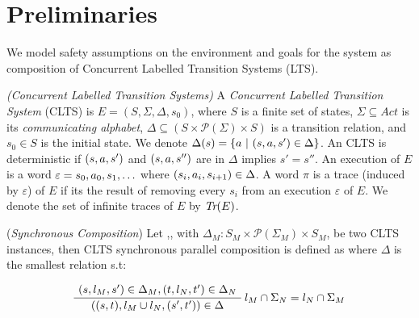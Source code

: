 \section{Preliminaries}

We model safety assumptions on the environment and goals for the system as composition of Concurrent Labelled Transition Systems (LTS). 

\begin{definition}
	\label{def:CLTS} \emph{(Concurrent Labelled Transition Systems)} 
	A \emph{Concurrent Labelled Transition System} (CLTS) is $E =  (S, \Sigma, \Delta, s_0)$, where $S$ is a finite set of states, $\Sigma \subseteq Act$ is its {\em communicating alphabet}, $\Delta \subseteq (S \times \mathcal{P}(\Sigma) \times S)$ is a transition relation, and $s_0 \in S$ is the initial state.  We denote $\Delta(s)=\{a~|~(s,a,s') \in \Delta\}$. 
	An CLTS is deterministic if $(s,a,s')$ and $(s,a,s'')$ are in $\Delta$ implies $s'=s''$.
	An execution of $E$ is a word $\varepsilon=s_0, a_0, s_1, \ldots$ where $(s_i, a_i, s_{i+1}) \in \Delta$. 
	A word $\pi$ is a trace (induced by $\varepsilon$) of $E$ if its the result of removing every $s_i$ from an execution $\varepsilon$ of $E$. 
	We denote the set of infinite traces of $E$ by $\emph{Tr}(E)$. 
\end{definition}


\begin{definition} 
	\label{def:synchronous_composition}(\emph{Synchronous Composition}) Let ,, with $\Delta_M : S_M \times \mathcal{P}(\Sigma_M) \times S_M$, be two CLTS instances, then CLTS synchronous parallel composition is defined as  where $\Delta$ is the smallest relation s.t:
	\begin{center}
		\begin{equation}
		\AxiomC{$(s, l_M, s') \in \Delta_M,(t, l_N, t') \in \Delta_N  $}\RightLabel{$l_M \cap \Sigma_N = l_N \cap \Sigma_M$}
		\UnaryInfC{$((s,t),l_M \cup l_N,(s',t')) \in \Delta$}
		\DisplayProof	
		\end{equation}	
	\end{center}
\end{definition}

